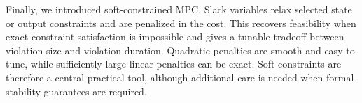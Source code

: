 Finally, we introduced soft-constrained MPC. Slack variables relax selected state or output
constraints and are penalized in the cost. This recovers feasibility when exact constraint
satisfaction is impossible and gives a tunable tradeoff between violation size and violation
duration. Quadratic penalties are smooth and easy to tune, while sufficiently large linear penalties
can be exact. Soft constraints are therefore a central practical tool, although additional care is
needed when formal stability guarantees are required.